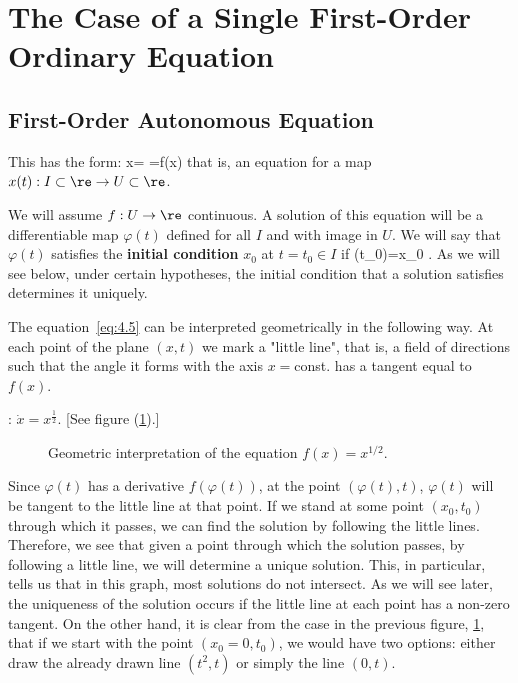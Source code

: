 \section{The Case of a Single First-Order Ordinary Equation}

\subsection{First-Order Autonomous Equation}


This has the form:
\beq
\dot x= =f(x)   \label{eq:4.5}
\eeq
\noindent 
that is, an equation for a map $x(t):I \subset \re
\to U\subset \re$.

\noindent We will assume $f:U\to \re$ continuous. A solution of this
equation will be a differentiable map $\varphi (t)$ defined for 
all $I$ and with image in $U$.
We will say that $\varphi (t)$ satisfies the {\bf initial condition}
$x_0$  at $t=t_0 \in I$ if 
\beq 
\varphi (t_0)=x_0 .   \label{eq:4.6}
\eeq   
As we will see below, under certain hypotheses, the initial
condition that a solution satisfies determines it uniquely.



The equation~\ref{eq:4.5} can be interpreted geometrically in the
following way. At each point of the plane $(x,t)$ we mark a
"little line", that is, a field of directions such that the
angle it forms with the axis $x=$const. has a tangent equal to $f(x)$.

\ejem: $\dot x = x^{\frac{1}{2}}$. [See figure (\ref{fig:4_1}).]


\begin{figure}[htbp]
  \begin{center}
    \caption{Geometric interpretation of the equation  $f(x)=x^{1/2}$.}
    \label{fig:4_1}
  \end{center}
\end{figure}

Since $\varphi (t)$ has a derivative $f(\varphi(t))$, at the point
$(\varphi(t),t)$, $\varphi(t)$ will be tangent to the little line at that
point. If we stand at some point $(x_0,t_0)$ through which it
passes, we can find the solution by following the little lines. Therefore,
we see that given a point through which the solution passes, by following
a little line, we will determine a unique solution. This, in particular,
tells us that in this graph, most solutions do not intersect.
As we will see later, the uniqueness of the solution occurs if the little line
at each point has a non-zero tangent. 
On the other hand, it is clear from the case in the previous figure, \ref{fig:4_1}, that if
we start with the point $(x_0=0,t_0)$, we would have two options: either
draw the already drawn line $(t^2,t)$ or simply the line $(0,t)$. 
\espa

